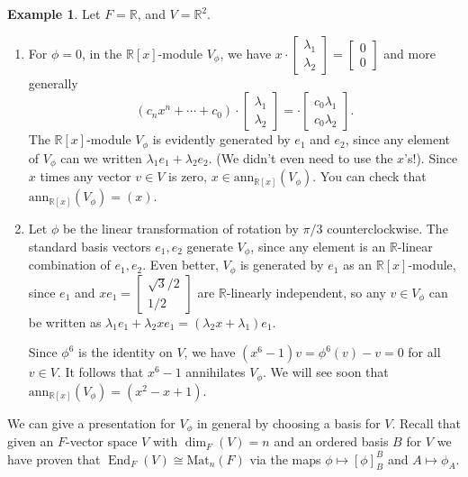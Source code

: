 \documentclass[12pt]{report}
\numberwithin{equation}{section}
\numberwithin{theorem}{chapter}
\theoremstyle{definition}
\newtheorem{example}[theorem]{Example}
\newtheorem*{basic properties}{Basic Properties}
\newtheorem*{Important Remark}{Important Remark}
\DeclareMathOperator{\End}{End}
\begin{document}
\begin{example}
Let $F=\mathbb{R}$, and $V=\mathbb{R}^2$.
\begin{enumerate}
\item For $\phi=0$, in the $\mathbb{R}[x]$-module $V_\phi$, we have $x \cdot \begin{bmatrix} \lambda_1 \\ \lambda_2 \end{bmatrix}= \begin{bmatrix} 0 \\ 0 \end{bmatrix}$ and more generally
\[ (c_n x^n +\cdots + c_0) \cdot \begin{bmatrix}  \lambda_1 \\  \lambda_2 \end{bmatrix} = \cdot \begin{bmatrix} c_0  \lambda_1 \\ c_0  \lambda_2 \end{bmatrix}.\]
The $\mathbb{R}[x]$-module $V_\phi$ is evidently generated by $e_1$ and $e_2$, since any element of $V_\phi$ can we written $\lambda_1 e_1 +  \lambda_2 e_2$. (We didn't even need to use the $x$'s!).
Since $x$ times any vector $v\in V$ is zero, $x\in \mathrm{ann}_{\mathbb{R}[x]}(V_\phi)$. You can check that $\mathrm{ann}_{\mathbb{R}[x]}(V_\phi) = (x)$.
\item Let $\phi$ be the linear transformation of rotation by $\pi/3$ counterclockwise. The standard basis vectors $e_1, e_2$ generate $V_\phi$, since any element is an $\mathbb{R}$-linear combination of $e_1,e_2$. Even better, $V_\phi$ is generated by $e_1$ as an $\mathbb{R}[x]$-module, since $e_1$ and $x e_1 = \begin{bmatrix} \sqrt{3}/2 \\ 1/2 \end{bmatrix}$ are $\mathbb{R}$-linearly independent, so any $v\in V_\phi$ can be written as $\lambda_1 e_1 + \lambda_2 x e_1 = (\lambda_2 x + \lambda_1) e_1$.

Since $\phi^6$ is the identity on $V$, we have $(x^6-1)v= \phi^6(v) - v = 0$ for all $v\in V$. It follows that $x^6-1$ annihilates $V_\phi$. We will see soon that $\mathrm{ann}_{\mathbb{R}[x]}(V_\phi) = (x^2 - x + 1)$.
\end{enumerate}
\end{example}

We can give a presentation for $V_\phi$ in general by choosing a basis for $V$. Recall that given an $F$-vector space $V$ with $\dim_F(V)=n$ and an ordered basis $B$ for $V$ we have proven that $\End_F(V)\cong \mathrm{Mat}_n(F)$ via the maps $\phi\mapsto [\phi]_B^B$ and $A\mapsto \phi_A$.
\end{document}
